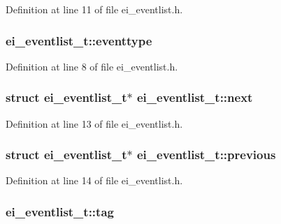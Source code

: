 Definition at line 11 of file ei\+\_\+eventlist.\+h.

\hypertarget{structei__eventlist__t_a0a2abf95b8cb56efa45ef9bcb521132b}{
\subsubsection[{eventtype}]{ ei\+\_\+eventlist\+\_\+t\+::eventtype}}\label{structei__eventlist__t_a0a2abf95b8cb56efa45ef9bcb521132b}


Definition at line 8 of file ei\+\_\+eventlist.\+h.

\hypertarget{structei__eventlist__t_a4672ce57c73628dd5ecb645691e0ff26}{
\subsubsection[{next}]{\setlength{\rightskip}{0pt plus 5cm}struct {\bf ei\+\_\+eventlist\+\_\+t}$\ast$ ei\+\_\+eventlist\+\_\+t\+::next}}\label{structei__eventlist__t_a4672ce57c73628dd5ecb645691e0ff26}


Definition at line 13 of file ei\+\_\+eventlist.\+h.

\hypertarget{structei__eventlist__t_ad114c93968018e8fce16f0a32da105aa}{
\subsubsection[{previous}]{\setlength{\rightskip}{0pt plus 5cm}struct {\bf ei\+\_\+eventlist\+\_\+t}$\ast$ ei\+\_\+eventlist\+\_\+t\+::previous}}\label{structei__eventlist__t_ad114c93968018e8fce16f0a32da105aa}


Definition at line 14 of file ei\+\_\+eventlist.\+h.

\hypertarget{structei__eventlist__t_a8827122ccd2ab2def51be82dc3e75aad}{
\subsubsection[{tag}]{ ei\+\_\+eventlist\+\_\+t\+::tag}}\label{structei__eventlist__t_a8827122ccd2ab2def51be82dc3e75aad}


